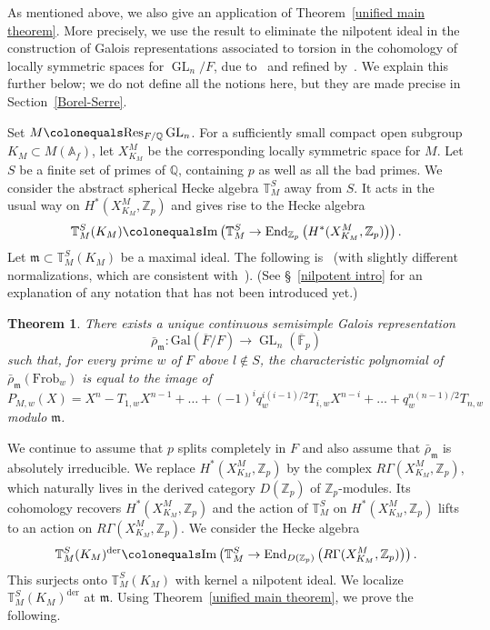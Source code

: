 \documentclass{amsart}
\newtheorem{thm}[subsubsection]{Theorem}
\theoremstyle{remark}
\numberwithin{equation}{subsection}
\newcommand{\A}{\AA}
\newcommand{\F}{\FF}
\newcommand{\Q}{\QQ}
\newcommand{\Z}{\ZZ}
\newcommand{\m}{\frakm}
\renewcommand{\AA}{{\mathbb A}}
\newcommand{\FF}{{\mathbb F}}
\newcommand{\QQ}{{\mathbb Q}}
\newcommand{\ZZ}{{\mathbb Z}}
\newcommand{\frakm}{\mathfrak{m}}
\DeclareMathOperator{\GL}{GL}
\newcommand{\Frob}{\mathrm{Frob}}
\newcommand{\defeq}{\colonequals}
\renewcommand{\(}{\left(}
\renewcommand{\)}{\right)}
\begin{document}
As mentioned above, we also give an application of Theorem~\ref{unified main theorem}. More precisely, we use the result to eliminate the nilpotent ideal in the construction of Galois representations associated to torsion in the cohomology of locally symmetric spaces for $\GL_n/F$, due to~\cite{scholze-galois} and refined by~\cite{newton-thorne}. We explain this further below; we do not define all the notions here, but they are made precise in Section~\ref{Borel-Serre}.

Set $M\defeq \mathrm{Res}_{F/\Q}\GL_n$. For a sufficiently small compact open subgroup $K_M\subset M(\A_f)$, let $X^{M}_{K_M}$ be the corresponding locally symmetric space for $M$. Let $S$ be a finite set of primes of $\Q$, containing $p$ as well as all the bad primes. We consider the abstract spherical Hecke algebra $\mathbb{T}^S_M$ away from $S$. It acts in the usual way on $H^*(X^M_{K_M}, \Z_p)$ and gives rise to the Hecke algebra 
\[
\mathbb{T}^S_M(K_M)\defeq \mathrm{Im}\left(\mathbb{T}^S_M\to \mathrm{End}_{\Z_p}\left(H^*(X^{M}_{K_M},\Z_p)\right)\right). 
\]
Let $\m\subset \mathbb{T}^S_M(K_M)$ be a maximal ideal. The following is~\cite[Cor.~5.4.3]{scholze-galois} 
(with slightly different normalizations, which are consistent with~\cite{newton-thorne}). (See \S~\ref{nilpotent intro} for an explanation of any notation
that has not been introduced yet.)

\begin{thm} There exists a unique continuous semisimple Galois representation 
\[
\bar{\rho}_{\m}\colon \mathrm{Gal}(\overline{F}/F)\to \GL_n(\overline{\F}_p)
\]
such that, for every prime $w$ of $F$ above $l\not\in S$, the characteristic polynomial of $\bar{\rho}_{\m}(\Frob_w)$ is equal to the image of
\[
P_{M,w}(X) = X^{n} - T_{1,w}X^{n-1}+\dots + (-1)^iq_{w}^{i(i-1)/2}T_{i,w}X^{n-i} +\dots + q_{w}^{n(n-1)/2}T_{n,w}
\]
modulo $\m$. 
\end{thm}

We continue to assume that $p$ splits completely in $F$ and also assume that $\bar{\rho}_{\m}$ is absolutely irreducible. We
replace $H^*(X^{M}_{K_M}, \Z_p)$ by the complex $R\Gamma(X^M_{K_M}, \Z_p)$, which naturally lives in the 
derived category $D(\Z_p)$ of $\Z_p$-modules. Its cohomology recovers $H^*(X^{M}_{K_M}, \Z_p)$ and the
action of $\mathbb{T}^S_M$ on $H^*(X^{M}_{K_M}, \Z_p)$ lifts to an action on $R\Gamma(X^M_{K_M}, \Z_p)$. 
We consider the Hecke algebra 
\[
\mathbb{T}^S_M(K_M)^{\mathrm{der}}\defeq \mathrm{Im}\left(\mathbb{T}^S_M\to \mathrm{End}_{D(\Z_p)}\left(R\Gamma(X^M_{K_M}, \Z_p)\right)\right). 
\]
This surjects onto $\mathbb{T}^S_M(K_M)$ with kernel a nilpotent ideal. We localize $\mathbb{T}^S_M(K_M)^{\mathrm{der}}$ at $\m$. 
Using Theorem~\ref{unified main theorem}, we prove the following. 
\end{document}
